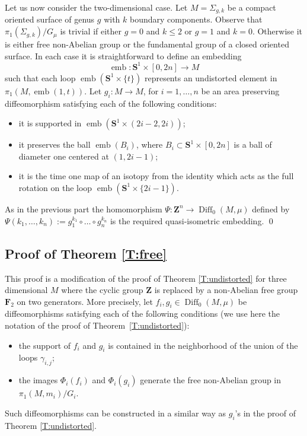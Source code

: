 \documentclass[a4paper,12pt]{amsart}
\def\Diff{\operatorname{Diff}}
\def\g{\gamma}
\theoremstyle{definition}
\def\OP{\operatorname}
\def\B{\mathbf}
\begin{document}
Let us now consider the two-dimensional case.  Let $M=\Sigma_{g,k}$ be
a compact oriented surface of genus $g$ with $k$ boundary
components. Observe that $\pi_1(\Sigma_{g,k})/G_{\mu}$ is trivial if
either $g=0$ and $k\leq 2$ or $g=1$ and $k=0$. Otherwise it is either
free non-Abelian group or the fundamental group of a closed oriented
surface. In each case it is straightforward to define an embedding
$$
\OP{emb}\colon \B S^1\times [0,2n] \to M
$$
such that each loop $\OP{emb}(\B S^1\times\{t\})$ represents
an undistorted element in $\pi_1(M,\OP{emb}(1,t))$.
Let $g_i\colon M\to M$, for $i=1,\ldots,n$
be an area preserving diffeomorphism satisfying each of
the following conditions:
\begin{itemize}
\item
it is supported in $\OP{emb}(\B S^1\times (2i-2,2i))$;
\item
it  preserves the ball $\OP{emb}(B_i)$, where
$B_i\subset \B S^1\times [0,2n]$ is a ball of
diameter one centered at $(1,2i-1)$;
\item
it is the time one map of an isotopy from the
identity which acts as the full rotation
on the loop $\OP{emb}(\B S^1\times \{2i-1\})$.
\end{itemize}

As in the previous part the homomorphism
$\Psi\colon \B Z^n\to \Diff_0(M,\mu)$ defined
by $\Psi(k_1,\ldots,k_n):=g_1^{k_1}\circ\dots\circ g_n^{k_n}$
is the required quasi-isometric embedding.
\qed

\subsection{Proof of Theorem \ref{T:free}} \label{SS:free}

This proof is a modification of the proof of Theorem
\ref{T:undistorted} for three dimensional $M$ where the cyclic group
$\B Z$ is replaced by a non-Abelian free group $\B F_2$ on two
generators.
More precisely, let $f_{i},g_{i}\in \Diff_0(M,\mu)$ be
diffeomorphisms satisfying each of the following conditions
(we use here the notation of the proof of Theorem~\ref{T:undistorted}):
\begin{itemize}
\item
the support of $f_{i}$ and $g_{i}$ is contained in the neighborhood
of the union of the loops $\g_{i,j}$;
\item
the images $\Phi_i(f_{i})$ and $\Phi_i(g_{i})$ generate
the free non-Abelian group in $\pi_1(M,m_i)/G_i$.
\end{itemize}
Such diffeomorphisms can be constructed in a similar way as
$g_i$'s in the proof of Theorem \ref{T:undistorted}.
\end{document}
